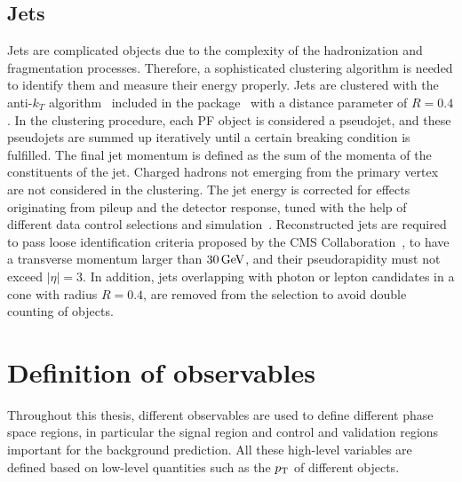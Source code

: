 \subsection{Jets}
Jets are complicated objects due to the complexity of the hadronization and fragmentation processes. Therefore, a sophisticated clustering algorithm is needed to identify them and measure their energy properly. Jets are clustered with the anti-$k_T$ algorithm~\cite{AntiKT} included in the \FASTJET package~\cite{FastJet1,FastJet2} with a distance parameter of $R=0.4$. In the clustering procedure, each PF object is considered a pseudojet, and these pseudojets are summed up iteratively until a certain breaking condition is fulfilled. The final jet momentum is defined as the sum of the momenta of the constituents of the jet. Charged hadrons not emerging from the primary vertex are not considered in the clustering. The jet energy is corrected for effects originating from pileup and the detector response, tuned with the help of different data control selections and simulation~\cite{JEC}. Reconstructed jets are required to pass loose identification criteria proposed by the CMS Collaboration~\cite{JetID}, to have a transverse momentum larger than $30\,\text{Ge\hspace{-.08em}V}$, and their pseudorapidity must not exceed $|\eta|=3$. In addition, jets overlapping with photon or lepton candidates in a cone with radius $R=0.4$, are removed from the selection to avoid double counting of objects.


\section{Definition of observables}
Throughout this thesis, different observables are used to define different phase space regions, in particular the signal region and control and validation regions important for the background prediction. All these high-level variables are defined based on low-level quantities such as the $p_{\mathrm{T}}$ of different objects.


